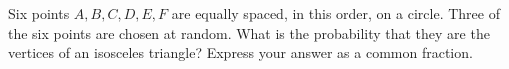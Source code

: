 Six points $A,B,C,D,E,F$ are equally spaced, in this order, on a circle. Three of the six points are chosen at random. What is the probability that they are the vertices of an isosceles triangle? Express your answer as a common fraction.
